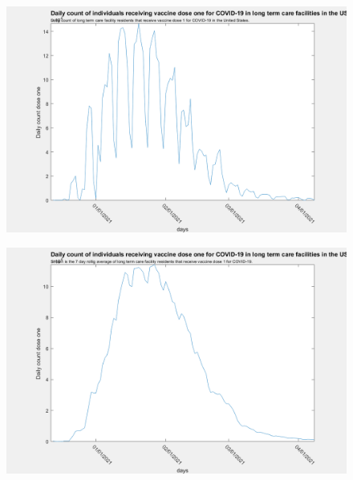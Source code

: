 \documentclass[twoside]{article}
\begin{document}
\begin{multicols}{2}
\begin{figure}[H]
	\includegraphics[width=\linewidth]{images/usa_daily_ltc_first_dose_unprocessed.png}
	\caption{}
	\label{fig:images/usa_daily_ltc_first_dose_unprocessedLabel}
\end{figure}

\begin{figure}[H]
	\includegraphics[width=\linewidth]{images/usa_daily_ltc_first_dose_processed.png}
	\caption{}
	\label{fig:images/usa_daily_ltc_first_dose_processedLabel}
\end{figure}


\end{multicols}
\end{document}
